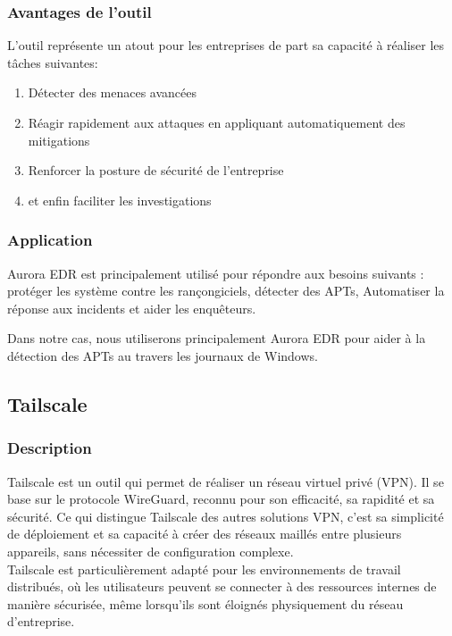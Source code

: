 \documentclass[12pt,letterpaper]{article}
\begin{document}
\subsubsection{Avantages de l'outil}

L'outil représente un atout pour les entreprises de part sa capacité à réaliser les tâches suivantes:
\begin{enumerate}
    \item Détecter des menaces avancées
    \item Réagir rapidement aux attaques en appliquant automatiquement des mitigations
    \item Renforcer la posture de sécurité de l'entreprise
    \item et enfin faciliter les investigations
\end{enumerate}

\subsubsection{Application}

Aurora EDR est principalement utilisé pour répondre aux besoins suivants : protéger les système contre les rançongiciels, détecter des APTs, Automatiser la réponse aux incidents et aider les enquêteurs.

\bigskip

Dans notre cas, nous utiliserons principalement Aurora EDR pour aider à la détection des APTs au travers les journaux de Windows.

\subsection{Tailscale}

\subsubsection{Description}

Tailscale est un outil qui permet de réaliser un réseau virtuel privé (VPN). Il se base sur le protocole WireGuard, reconnu pour son efficacité, sa rapidité et sa sécurité. Ce qui distingue Tailscale des autres solutions VPN, c'est sa simplicité de déploiement et sa capacité à créer des réseaux maillés entre plusieurs appareils, sans nécessiter de configuration complexe. \\
Tailscale est particulièrement adapté pour les environnements de travail distribués, où les utilisateurs peuvent se connecter à des ressources internes de manière sécurisée, même lorsqu'ils sont éloignés physiquement du réseau d'entreprise.
\end{document}
